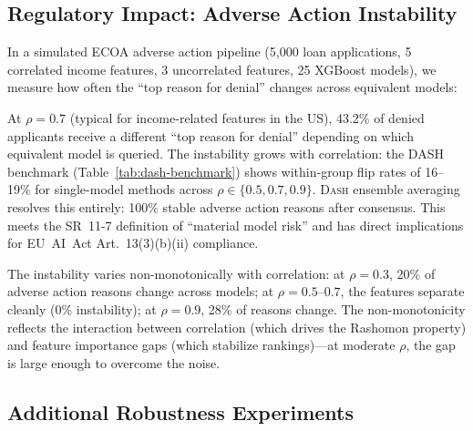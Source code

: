 \documentclass{jmlr}
\newcommand{\DASH}{\textsc{Dash}}
\begin{document}
\subsection{Regulatory Impact: Adverse Action Instability}
\label{sec:regulatory-experiment}

In a simulated ECOA adverse action pipeline (5,000 loan applications, 5 correlated income features, 3 uncorrelated features, 25 XGBoost models), we measure how often the ``top reason for denial'' changes across equivalent models:

At $\rho = 0.7$ (typical for income-related features in the US), 43.2\% of denied applicants receive a different ``top reason for denial'' depending on which equivalent model is queried. The instability grows with correlation: the DASH benchmark (Table~\ref{tab:dash-benchmark}) shows within-group flip rates of 16--19\% for single-model methods across $\rho \in \{0.5, 0.7, 0.9\}$. \DASH{} ensemble averaging resolves this entirely: 100\% stable adverse action reasons after consensus. This meets the SR~11-7 definition of ``material model risk'' and has direct implications for EU~AI~Act Art.~13(3)(b)(ii) compliance.

The instability varies non-monotonically with correlation: at $\rho = 0.3$, 20\% of adverse action reasons change across models; at $\rho = 0.5$--$0.7$, the features separate cleanly (0\% instability); at $\rho = 0.9$, 28\% of reasons change. The non-monotonicity reflects the interaction between correlation (which drives the Rashomon property) and feature importance gaps (which stabilize rankings)---at moderate $\rho$, the gap is large enough to overcome the noise.

\subsection{Additional Robustness Experiments}
\label{sec:robustness-experiments}
\end{document}
